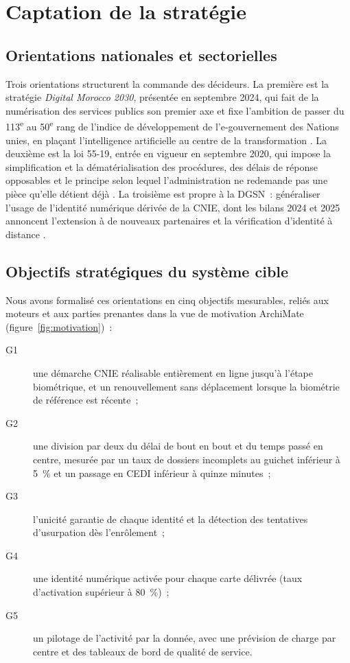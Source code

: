 \section{Captation de la stratégie}
\label{sec:strategie}

\subsection{Orientations nationales et sectorielles}
Trois orientations structurent la commande des décideurs. La première est la stratégie \emph{Digital Morocco 2030}, présentée en septembre 2024, qui fait de la numérisation des services publics son premier axe et fixe l'ambition de passer du 113\textsuperscript{e} au 50\textsuperscript{e} rang de l'indice de développement de l'e-gouvernement des Nations unies, en plaçant l'intelligence artificielle au centre de la transformation \cite{hespress2024dm2030, ledesk2024dm2030}. La deuxième est la loi 55-19, entrée en vigueur en septembre 2020, qui impose la simplification et la dématérialisation des procédures, des délais de réponse opposables et le principe selon lequel l'administration ne redemande pas une pièce qu'elle détient déjà \cite{mmsp2021loi5519}. La troisième est propre à la DGSN~: généraliser l'usage de l'identité numérique dérivée de la CNIE, dont les bilans 2024 et 2025 annoncent l'extension à de nouveaux partenaires et la vérification d'identité à distance \cite{allafrica2024bilan, ecoactu2025idn}.

\subsection{Objectifs stratégiques du système cible}
Nous avons formalisé ces orientations en cinq objectifs mesurables, reliés aux moteurs et aux parties prenantes dans la vue de motivation ArchiMate (figure~\ref{fig:motivation})~:
\begin{description}
  \item[G1] une démarche CNIE réalisable entièrement en ligne jusqu'à l'étape biométrique, et un renouvellement sans déplacement lorsque la biométrie de référence est récente~;
  \item[G2] une division par deux du délai de bout en bout et du temps passé en centre, mesurée par un taux de dossiers incomplets au guichet inférieur à 5~\% et un passage en CEDI inférieur à quinze minutes~;
  \item[G3] l'unicité garantie de chaque identité et la détection des tentatives d'usurpation dès l'enrôlement~;
  \item[G4] une identité numérique activée pour chaque carte délivrée (taux d'activation supérieur à 80~\%)~;
  \item[G5] un pilotage de l'activité par la donnée, avec une prévision de charge par centre et des tableaux de bord de qualité de service.
\end{description}

